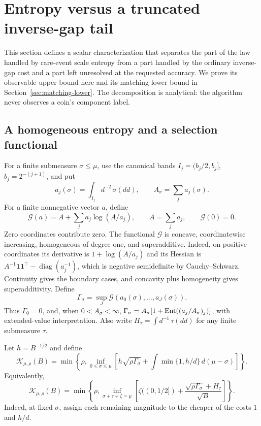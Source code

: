 \section{Entropy versus a truncated inverse-gap tail}\label{sec:additive}

This section defines a scalar characterization that separates the part of
the law handled by rare-event scale entropy from a part handled by the
ordinary inverse-gap cost and a part left unresolved at the requested
accuracy. We prove its observable upper bound here and its matching lower
bound in Section~\ref{sec:matching-lower}. The decomposition is analytical:
the algorithm never observes a coin's component label.

\subsection{A homogeneous entropy and a selection functional}

For a finite submeasure $\sigma\le\mu$, use the canonical bands
$I_j=(b_j/2,b_j]$, $b_j=2^{-(j+1)}$, and put
\[
 a_j(\sigma)=\int_{I_j}d^{-2}\,\sigma(dd),\qquad
 A_\sigma=\sum_j a_j(\sigma).
\]
For a finite nonnegative vector $a$, define
\[
 \mathcal G(a)=A+\sum_j a_j\log(A/a_j),\qquad A=\sum_j a_j,
 \qquad \mathcal G(0)=0.
\]
Zero coordinates contribute zero. The functional $\mathcal G$ is concave, coordinatewise increasing,
homogeneous of degree one, and superadditive. Indeed, on positive
coordinates its derivative is $1+\log(A/a_j)$ and its Hessian is
$A^{-1}\mathbf1\mathbf1^\top-\operatorname{diag}(a_j^{-1})$,
which is negative semidefinite by Cauchy--Schwarz. Continuity gives the
boundary cases, and concavity plus homogeneity gives superadditivity. Define
\begin{equation}\label{eq:submeasure-entropy}
 \Gamma_\sigma=\sup_J\mathcal G(a_0(\sigma),\ldots,a_J(\sigma)).
\end{equation}
Thus $\Gamma_0=0$, and, when $0<A_\sigma<\infty$,
$\Gamma_\sigma=A_\sigma[1+\operatorname{Ent}((a_j/A_\sigma)_j)]$, with extended-value
interpretation. Also write
$H_\tau=\int d^{-1}\,\tau(dd)$ for any finite submeasure $\tau$.

Let $h=B^{-1/2}$ and define
\begin{equation}\label{eq:scalar-selection}
 \boxed{\quad
 \mathcal K_{\mu,\rho}(B)=
 \min\left\{\rho,\inf_{0\le\sigma\le\mu}
 \left[h\sqrt{\rho\Gamma_\sigma}
       +\int\min\{1,h/d\}\,d(\mu-\sigma)\right]\right\}.
 \quad}
\end{equation}
Equivalently,
\begin{equation}\label{eq:three-piece-functional}
 \mathcal K_{\mu,\rho}(B)=
 \min\left\{\rho,\inf_{\sigma+\tau+\zeta=\mu}
 \left[\zeta((0,1/2])
       +\frac{\sqrt{\rho\Gamma_\sigma}+H_\tau}{\sqrt B}\right]\right\}.
\end{equation}
Indeed, at fixed $\sigma$, assign each remaining magnitude to the cheaper
of the costs $1$ and $h/d$.


